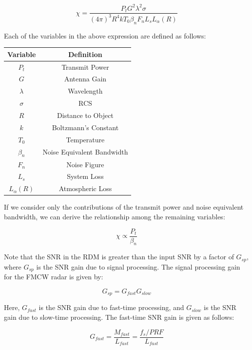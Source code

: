 \documentclass[conference]{IEEEtran}
\begin{document}
	\begin{equation}
		\chi = \frac{P_tG^2\lambda^2\sigma}{(4\pi)^3R^4kT_0\beta_nF_nL_sL_{\alpha}(R)}
	\end{equation}
	
	Each of the variables in the above expression are defined as follows:
	
	\begin{center}
	\begin{tabular}{|c|c|}
		\hline
		Variable & Definition \\
		\hline
		$P_t$ & Transmit Power \\
		\hline
		$G$ & Antenna Gain \\
		\hline
		$\lambda$ & Wavelength \\
		\hline
		$\sigma$ & RCS \\
		\hline
		$R$ & Distance to Object \\
		\hline
		$k$ & Boltzmann's Constant \\
		\hline
		$T_0$ & Temperature \\
		\hline
		$\beta_n$ & Noise Equivalent Bandwidth \\
		\hline
		$F_n$ & Noise Figure \\
		\hline
		$L_s$ & System Loss \\
		\hline
		$L_{\alpha}(R)$ & Atmospheric Loss \\
		\hline
	\end{tabular}
	\end{center}	
	
	If we consider only the contributions of the transmit power and noise equivalent bandwidth, we can derive the relationship among the remaining variables:
	
	\begin{equation}
		\chi \propto \frac{P_t}{\beta_n}
	\end{equation}
	
	Note that the SNR in the RDM is greater than the input SNR by a factor of $G_{sp}$, where $G_{sp}$ is the SNR gain due to signal processing. The signal processing gain for the FMCW radar is given by:
	
	\begin{equation}
		G_{sp} = G_{fast}G_{slow}
	\end{equation}
	
	Here, $G_{fast}$ is the SNR gain due to fast-time processing, and $G_{slow}$ is the SNR gain due to slow-time processing. The fast-time SNR gain is given as follows:
	
	\begin{equation}
		 G_{fast} = \frac{M_{fast}}{L_{fast}} = \frac{f_s/PRF}{L_{fast}}
	\end{equation}
		
\end{document}

